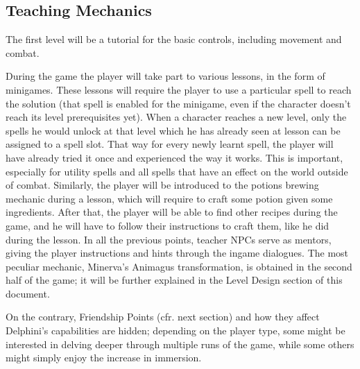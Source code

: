 \pagebreak

\subsection{Teaching Mechanics}

The first level will be a tutorial for the basic controls, including movement and combat.

During the game the player will take part to various lessons, in the form of minigames. These lessons will require the player to use a particular spell to reach the solution (that spell is enabled for the minigame, even if the character doesn't reach its level prerequisites yet).
When a character reaches a new level, only the spells he would unlock at that level which he has already seen at lesson can be assigned to a spell slot. That way for every newly learnt spell, the player will have already tried it once and experienced the way it works.
This is important, especially for utility spells and all spells that have an effect on the world outside of combat.
Similarly, the player will be introduced to the potions brewing mechanic during a lesson, which will require to craft some potion given some ingredients. After that, the player will be able to find other recipes during the game, and he will have to follow their instructions to craft them, like he did during the lesson.
In all the previous points, teacher NPCs serve as mentors, giving the player instructions and hints through the ingame dialogues.
The most peculiar mechanic, Minerva's Animagus transformation, is obtained in the second half of the game; it will be further explained in the Level Design section of this document.

On the contrary, Friendship Points (cfr. next section) and how they affect Delphini's capabilities are hidden; depending on the player type, some might be interested in delving deeper through multiple runs of the game, while some others might simply enjoy the increase in immersion.

\pagebreak